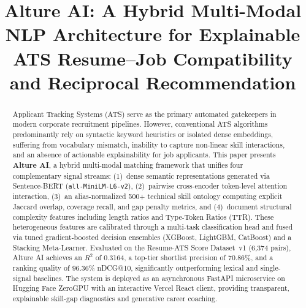 \documentclass[conference]{IEEEtran}
\begin{document}
\title{Alture AI: A Hybrid Multi-Modal NLP Architecture for Explainable ATS Resume--Job Compatibility and Reciprocal Recommendation}

\author{
}

\maketitle

\begin{abstract}
Applicant Tracking Systems (ATS) serve as the primary automated gatekeepers in modern corporate recruitment pipelines. However, conventional ATS algorithms predominantly rely on syntactic keyword heuristics or isolated dense embeddings, suffering from vocabulary mismatch, inability to capture non-linear skill interactions, and an absence of actionable explainability for job applicants. This paper presents \textbf{Alture AI}, a hybrid multi-modal matching framework that unifies four complementary signal streams: (1)~dense semantic representations generated via Sentence-BERT (\texttt{all-MiniLM-L6-v2}), (2)~pairwise cross-encoder token-level attention interaction, (3)~an alias-normalized 500+ technical skill ontology computing explicit Jaccard overlap, coverage recall, and gap penalty metrics, and (4)~document structural complexity features including length ratios and Type-Token Ratios (TTR). These heterogeneous features are calibrated through a multi-task classification head and fused via tuned gradient-boosted decision ensembles (XGBoost, LightGBM, CatBoost) and a Stacking Meta-Learner. Evaluated on the Resume-ATS Score Dataset~v1 (6,374 pairs), Alture AI achieves an $R^2$ of 0.3164, a top-tier shortlist precision of 70.86\%, and a ranking quality of 96.36\% nDCG@10, significantly outperforming lexical and single-signal baselines. The system is deployed as an asynchronous FastAPI microservice on Hugging Face ZeroGPU with an interactive Vercel React client, providing transparent, explainable skill-gap diagnostics and generative career coaching.
\end{abstract}
\end{document}
